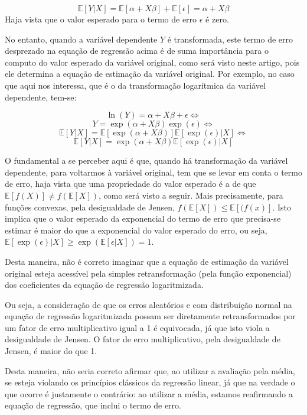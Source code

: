 \documentclass[a4paper, 12pt]{article}
\begin{document}
\[\mathbb{E}[Y|X] = \mathbb{E}[\alpha + X\beta] + \mathbb{E}[\epsilon] = \alpha + X\beta\]
Haja vista que o valor esperado para o termo de erro \(\epsilon\) é
zero.

No entanto, quando a variável dependente \(Y\) é transformada, este
termo de erro desprezado na equação de regressão acima é de suma
importância para o computo do valor esperado da variável original, como
será visto neste artigo, pois ele determina a equação de estimação da
variável original. Por exemplo, no caso que aqui nos interessa, que é o
da transformação logarítmica da variável dependente, tem-se:

\[\ln(Y) = \alpha + X\beta + \epsilon \Leftrightarrow\]
\[Y = \exp(\alpha + X\beta)\exp(\epsilon) \Leftrightarrow\]
\[\mathbb{E}[Y|X] = \mathbb{E}[\exp(\alpha + X\beta)]\mathbb{E}[\exp(\epsilon)|X] \Leftrightarrow\]
\[\mathbb{E}[Y|X] = \exp(\alpha + X\beta)\mathbb{E}[\exp(\epsilon)|X]\]

O fundamental a se perceber aqui é que, quando há transformação da
variável dependente, para voltarmos à variável original, tem que se
levar em conta o termo de erro, haja vista que uma propriedade do valor
esperado é a de que \(\mathbb{E}[f(X)] \ne f(\mathbb{E}[X])\), como será
visto a seguir. Mais precisamente, para funções convexas, pela
desigualdade de Jensen, \(f(\mathbb{E}[X]) \leq \mathbb{E}[(f(x)]\).
Isto implica que o valor esperado da exponencial do termo de erro que
precisa-se estimar é maior do que a exponencial do valor esperado do
erro, ou seja,
\(\mathbb{E}[\exp(\epsilon)|X] \geq \exp(\mathbb{E}[\epsilon|X]) = 1\).

Desta maneira, não é correto imaginar que a equação de estimação da
variável original esteja acessível pela simples retransformação (pela
função exponencial) dos coeficientes da equação de regressão
logaritmizada.

Ou seja, a consideração de que os erros aleatórios e com distribuição
normal na equação de regressão logaritmizada possam ser diretamente
retransformados por um fator de erro multiplicativo igual a 1 é
equivocada, já que isto viola a desigualdade de Jensen. O fator de erro
multiplicativo, pela desigualdade de Jensen, é maior do que 1.

Desta maneira, não seria correto afirmar que, ao utilizar a avaliação
pela média, se esteja violando os princípios clássicos da regressão
linear, já que na verdade o que ocorre é justamente o contrário: ao
utilizar a média, estamos reafirmando a equação de regressão, que inclui
o termo de erro.
\end{document}

